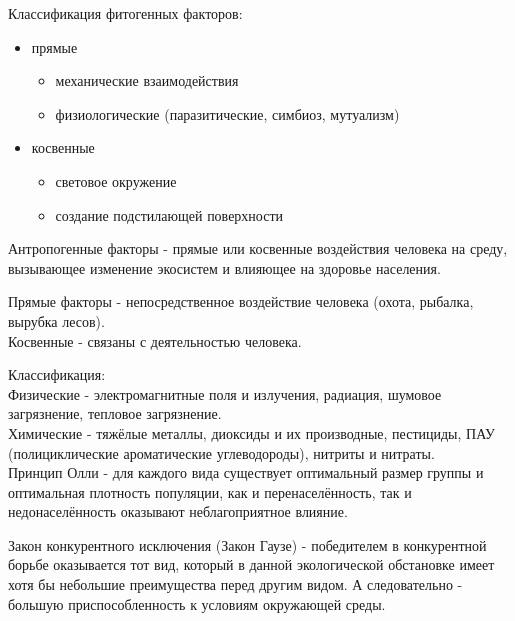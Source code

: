 Классификация фитогенных факторов:
\begin{itemize}
\item прямые
\begin{itemize}
\item механические взаимодействия
\item физиологические (паразитические, симбиоз, мутуализм)
\end{itemize}
\item косвенные
\begin{itemize}
\item световое окружение
\item создание подстилающей поверхности
\end{itemize}
\end{itemize}

Антропогенные факторы - прямые или косвенные воздействия человека на среду, вызывающее изменение экосистем и влияющее на здоровье населения.

Прямые факторы - непосредственное воздействие человека (охота, рыбалка, вырубка лесов).\\
Косвенные - связаны с деятельностью человека.

Классификация:\\
Физические - электромагнитные поля и излучения, радиация, шумовое загрязнение, тепловое загрязнение.\\
Химические - тяжёлые металлы, диоксиды и их производные, пестициды, ПАУ (полициклические ароматические углеводороды), нитриты и нитраты.\\


Принцип Олли - для каждого вида существует оптимальный размер группы и оптимальная плотность популяции, как и перенаселённость, так и недонаселённость оказывают неблагоприятное влияние.

Закон конкурентного исключения (Закон Гаузе) - победителем в конкурентной борьбе оказывается тот вид, который в данной экологической обстановке имеет хотя бы небольшие преимущества перед другим видом. А следовательно - большую приспособленность к условиям окружающей среды.